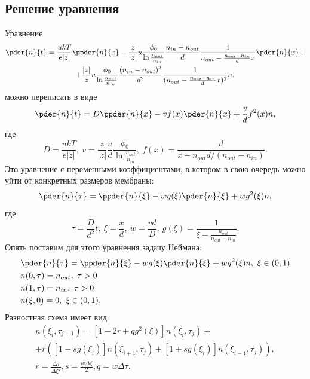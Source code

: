 \subsection{Решение уравнения}
    Уравнение
    \begin{gather}
        \pder{n}{t} = \frac{ukT}{e|z|}\ppder{n}{x} -
        \frac{z}{|z|}u\frac{\phi_0}{\ln\frac{n_{out}}{n_{in}}}
        \frac{n_{in} - n_{out}}{d}
        \frac{1}{n_{out} - \frac{n_{out} - n_{in}}{d} x}
        \pder{n}{x} + \nonumber \\
        + \frac{|z|}{z}u\frac{\phi_0}{\ln\frac{n_{out}}{n_{in}}}
        \frac{(n_{in} - n_{out})^2}{d^2}
        \frac{1}{(n_{out} - \frac{n_{out} - n_{in}}{d} x)^2}n.
    \end{gather}
    можно переписать в виде
    \begin{equation}
        \pder{n}{t} = D\ppder{n}{x} - vf(x)\pder{n}{x} + \frac{v}{d}f^2(x)n,
    \end{equation}
    где
    \begin{equation}
        D = \frac{ukT}{e|z|},\ v = \frac{z}{|z|}\frac{u}{d}
        \frac{\phi_0}{\ln\frac{n_{out}}{n_{in}}},
        \ f(x) = \frac{d}{x - n_{out}d / (n_{out}-n_{in})}.
    \end{equation}
    Это уравнение с переменными коэффициентами, в котором в свою очередь можно
    уйти от конкретных размеров мембраны:
    \begin{equation}
        \pder{n}{\tau} = \ppder{n}{\xi} - wg(\xi)\pder{n}{\xi} + wg^2(\xi)n,
    \end{equation}
    где
    \begin{equation}
        \tau = \frac{D}{d^2}t,\ \xi = \frac{x}{d},\ w = \frac{vd}{D},
        \ g(\xi) = \frac{1}{\xi - \frac{n_{out}}{n_{out} - n_{in}}}.
    \end{equation}
    Опять поставим для этого уравнения задачу Неймана:
    \begin{align*}
        & \pder{n}{\tau} = \ppder{n}{\xi} - wg(\xi)\pder{n}{\xi} + wg^2(\xi)n,
            \ \xi\in(0,1) \\
        & n(0, \tau) = n_{out},\ \tau>0 \\
        & n(1, \tau) = n_{in},\ \tau>0 \\
        & n(\xi, 0) = 0,\ \xi\in(0,1).
    \end{align*}
    Разностная схема имеет вид
    \begin{gather*}
        n(\xi_i,\tau_{j+1}) =
        [1-2r+qg^2(\xi)]n(\xi_i, \tau_j) +\\
        + r\left(
            [1 - sg(\xi_i)]n(\xi_{i+1},\tau_j) +
            [1 + sg(\xi_i)]n(\xi_{i-1},\tau_j)
        \right),\\
        r = \frac{\Delta\tau}{\Delta\xi^2}, s = \frac{w\Delta\xi}{2},
        q = w\Delta\tau.
    \end{gather*}

